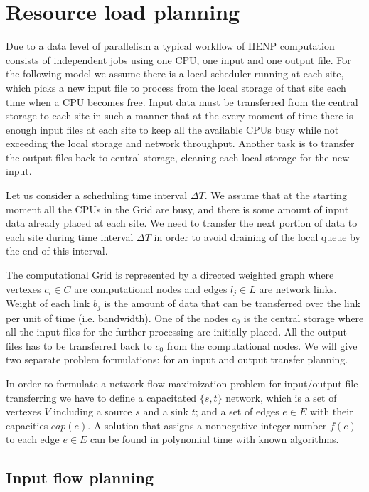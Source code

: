 \documentclass[english]{ddny}
\begin{document}
\section{Resource load planning}
\label{Network_flow}
Due to a data level of parallelism a typical workflow of HENP computation
consists of independent jobs using one CPU, one input and one output file. For the following model we assume there is a local scheduler running at each site, which picks a new
input file to process from the local storage of that site each time when a CPU becomes
free. Input data must be transferred from the central storage
to each site in such a manner that at the every moment of time there is enough
input files at each site to keep all the available CPUs busy while not
exceeding the local storage and network throughput. Another task
is to transfer the output files back to central storage, cleaning each local
storage for the new input.

Let us consider a scheduling time interval $\Delta T$. We assume that at the
starting moment all the CPUs in the Grid are busy, and there is some amount of
input data already placed at each site. We need to transfer the next portion
of data to each site during time interval $\Delta T$ in order to avoid
draining of the local queue by the end of this interval. 

The computational Grid is represented by a directed weighted graph where
vertexes $c_{i} \in C$ are computational nodes and edges $l_{j} \in L$ are
network links. Weight of each link $b_{j}$ is the amount of data that can be
transferred over the link per unit of time (i.e. bandwidth). One of the nodes
$c_{0}$ is the central storage where all the input files for the further
processing are initially placed. All the output files has to be transferred
back to $c_{0}$ from the computational nodes. We will give two separate
problem formulations: for an input and output transfer planning. 

In order to formulate a network flow maximization problem \cite{Network_flows}
for input/output file transferring we have to define a capacitated $\{s,t\}$
network, which is a set of vertexes $V$ including a source $s$ and a sink $t$;
and a set of edges $e\in E$ with their capacities $cap(e)$. A solution that
assigns a nonnegative integer number $f(e)$ to each edge $e \in E$ can be
found in polynomial time with known algorithms.

\subsection{Input flow planning}
\label{inproblem}
\end{document}
